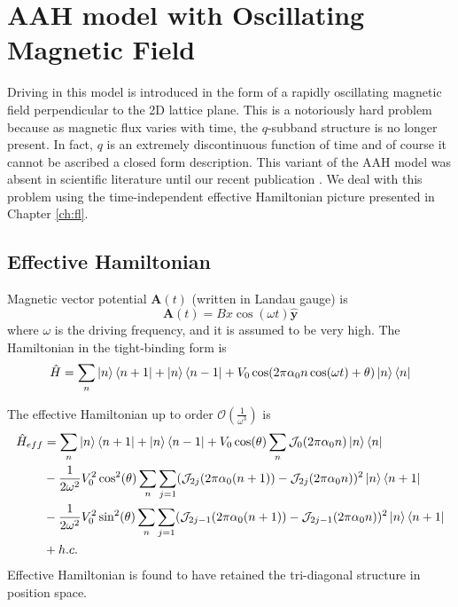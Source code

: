 %

\chapter{AAH model with Oscillating Magnetic Field}
Driving in this model is introduced in the form of a rapidly oscillating magnetic field perpendicular to the 2D lattice plane. This is a notoriously hard
problem because as magnetic flux varies with time, the $q$-subband structure is no longer present. In fact, $q$ is an extremely discontinuous function of time and of course
it cannot be ascribed a closed form description. This variant of the AAH model was absent in scientific literature until our recent publication \cite{mishra2016phase}.
We deal with this problem using the time-independent effective Hamiltonian picture presented in Chapter \ref{ch:fl}.

\section{Effective Hamiltonian}
Magnetic vector potential $\mathbf{A}(t)$ (written in Landau gauge) is
\begin{equation}
 \mathbf{A}(t) = Bx \cos(\omega t) \hat{\mathbf{y}}
\end{equation} where $\omega$ is the driving frequency, and it is assumed to be very high.
The Hamiltonian in the tight-binding form is
\begin{equation}
 \hat{H} = \sum_{n} \ket{n}\bra{n+1} + \ket{n}\bra{n-1} + V_{0}\cos(2\pi\alpha_{0}n\cos(\omega t) + \theta)\ket{n}\bra{n}
\end{equation}

The effective Hamiltonian up to order $\mathcal{O}(\frac{1}{\omega^3})$ is
\begin{equation}
 \begin{split}
  \hat{H}_{eff} &= \sum_{n} \ket{n}\bra{n+1} + \ket{n}\bra{n-1} + V_{0}\cos(\theta)\sum_{n}\mathcal{J}_{0}(2\pi\alpha_0 n)\ket{n}\bra{n} \\
  &- \frac{1}{2\omega^2}V_{0}^2 \cos^{2}(\theta) \sum_{n}\sum_{j=1} (\mathcal{J}_{2j}(2\pi\alpha_0 (n+1)) - \mathcal{J}_{2j}(2\pi\alpha_0 n))^2 \ket{n}\bra{n+1} \\
  &- \frac{1}{2\omega^2}V_{0}^2 \sin^{2}(\theta) \sum_{n}\sum_{j=1} (\mathcal{J}_{2j-1}(2\pi\alpha_0 (n+1)) - \mathcal{J}_{2j-1}(2\pi\alpha_0 n))^2 \ket{n}\bra{n+1} \\ 
  & + h.c.
 \end{split}
\end{equation}
Effective Hamiltonian is found to have retained the tri-diagonal structure in position space.

